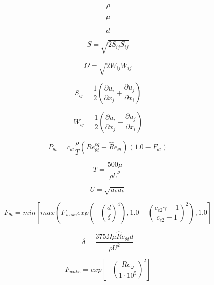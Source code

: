 \documentclass[8pt]{article}
\begin{document}
\begin{equation}
   \rho
\end{equation}

\begin{equation}
   \mu
\end{equation}

\begin{equation}
   d
\end{equation}

\begin{equation}
   S = \sqrt{2S_{ij}S_{ij}}
\end{equation}

\begin{equation}
   \Omega = \sqrt{2W_{ij}W_{ij}}
\end{equation}

\begin{equation}
   S_{ij}=\frac{1}{2} \left( \frac{\partial u_i}{\partial x_j} +  \frac{\partial u_j}{\partial x_i} \right)
\end{equation}

\begin{equation}
   W_{ij}=\frac{1}{2} \left( \frac{\partial u_i}{\partial x_j} -  \frac{\partial u_j}{\partial x_i} \right)
\end{equation}

\begin{equation}
    P_{\theta t} = c_{\theta t} \frac{\rho}{T} \left( Re_{\theta t}^{eq} - \hat Re_{\theta t} \right) \left( 1.0 - F_{\theta t} \right)
\end{equation}

\begin{equation}
    T = \frac{500 \mu}{\rho U^2}
\end{equation}

\begin{equation}
    U = \sqrt{ u_k u_k}
\end{equation}

\begin{equation}
    F_{\theta t} = min \left[ max \left( F_{wake} exp \left(- \left( \frac{d}{\delta} \right) ^4 \right) , 1.0 - \left( \frac{c_{e2}\gamma - 1}{c_{e2} - 1}\right) ^2 \right), 1.0 \right]
\end{equation}

\begin{equation}
    \delta = \frac{375 \Omega \mu \hat Re_{\theta t} d}{\rho U^2}
\end{equation}

\begin{equation}
    F_{wake} = exp \left[ - \left( \frac{Re_{\omega}}{1\cdot 10^{5}} \right) ^2 \right]
\end{equation}
\end{document}
